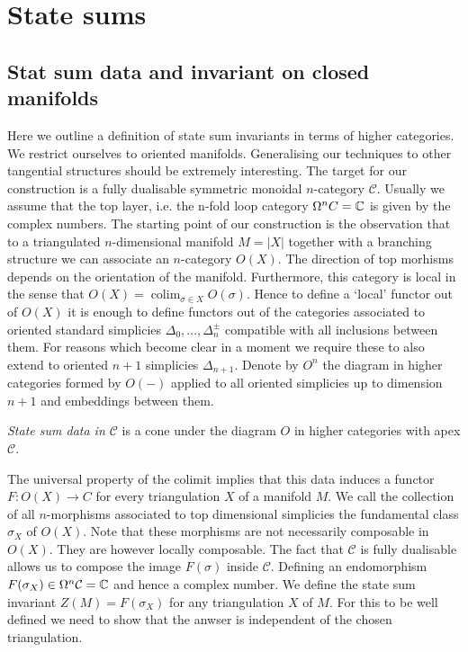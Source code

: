 \section{State sums} 
\subsection{Stat sum data and invariant on closed manifolds}
Here we outline a definition of state sum invariants in terms of higher categories. We restrict ourselves to oriented manifolds. Generalising our techniques to other tangential structures should be extremely interesting. The target for our construction is a fully dualisable symmetric monoidal $n$-category $\mathcal{C}$. Usually we assume that the top layer, i.e. the n-fold loop category $\Omega^nC = \mathbb{C} $ is given by the complex numbers.   
The starting point of our construction is the observation that to a triangulated $n$-dimensional manifold 
$M=|X|$ together with a branching structure we can associate an $n$-category $O(X)$. The direction of top morhisms depends on the orientation of the manifold. Furthermore, this category is local in the sense that $O(X)=\operatorname{colim}_{\sigma \in X} O(\sigma)$. 
Hence to define a `local' functor out of $O(X)$ it is enough to define functors out of the categories associated to oriented standard simplicies $\Delta_0,\dots , \Delta_n^\pm$ compatible with all inclusions between them. 
For reasons which become clear in a moment we require these to also extend to oriented $n+1$ simplicies $\Delta_{n+1}$. Denote by $O^n$ the diagram in higher categories formed by $O(-)$ applied to all oriented simplicies up to dimension $n+1$ and embeddings between them.   
\begin{definition}
\emph{State sum data in $\mathcal{C}$} is a cone under the diagram $O$ in higher categories with apex $\mathcal{C}$.  
\end{definition}
The universal property of the colimit implies that this data induces a functor $F\colon O(X)\longrightarrow C $ for every triangulation $X$ of a manifold $M$. We call the collection of all $n$-morphisms associated to top dimensional simplicies the fundamental class $\sigma_X$ of $O(X)$. Note that these morphisms are not necessarily composable in $O(X)$. They are however locally composable. The fact that $\mathcal{C}$ is fully dualisable 
allows us to compose the image $F(\sigma)$ inside $\mathcal{C}$. Defining an endomorphism 
$F(\sigma_X)\in \Omega^n\mathcal{C}=\mathbb{C} $ and hence a complex number. We define the state sum invariant $Z(M)=F(\sigma_X)$ for any triangulation $X$ of $M$. For this to be well defined we need to show that the anwser is independent of the chosen triangulation. 
